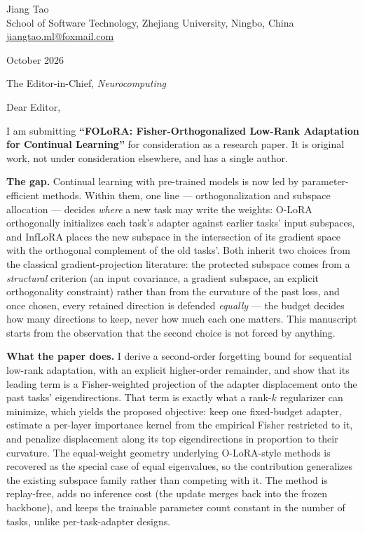 \documentclass[10pt]{article}
\begin{document}
\begin{flushright}
Jiang Tao\\
School of Software Technology, Zhejiang University, Ningbo, China\\
\href{mailto:jiangtao.ml@foxmail.com}{jiangtao.ml@foxmail.com}
\end{flushright}

\vspace{-1em}
 October 2026

\vspace{-0.5em}
\noindent The Editor-in-Chief, \emph{Neurocomputing}

\vspace{-0.5em}
\noindent Dear Editor,

I am submitting \textbf{``FOLoRA: Fisher-Orthogonalized Low-Rank Adaptation for Continual
Learning''} for consideration as a research paper. It is original work, not under
consideration elsewhere, and has a single author.

\textbf{The gap.} Continual learning with pre-trained models is now led by
parameter-efficient methods. Within them, one line --- orthogonalization and subspace
allocation --- decides \emph{where} a new task may write the weights: O-LoRA orthogonally
initializes each task's adapter against earlier tasks' input subspaces, and InfLoRA places
the new subspace in the intersection of its gradient space with the orthogonal complement
of the old tasks'. Both inherit two choices from the classical gradient-projection
literature: the protected subspace comes from a \emph{structural} criterion (an input
covariance, a gradient subspace, an explicit orthogonality constraint) rather than from
the curvature of the past loss, and once chosen, every retained direction is defended
\emph{equally} --- the budget decides how many directions to keep, never how much each one
matters. This manuscript starts from the observation that the second choice is not forced
by anything.

\textbf{What the paper does.} I derive a second-order forgetting bound for sequential
low-rank adaptation, with an explicit higher-order remainder, and show that its leading
term is a Fisher-weighted projection of the adapter displacement onto the past tasks'
eigendirections. That term is exactly what a rank-$k$ regularizer can minimize, which
yields the proposed objective: keep one fixed-budget adapter, estimate a per-layer
importance kernel from the empirical Fisher restricted to it, and penalize displacement
along its top eigendirections in proportion to their curvature. The equal-weight geometry
underlying O-LoRA-style methods is recovered as the special case of equal eigenvalues, so
the contribution generalizes the existing subspace family rather than competing with it.
The method is replay-free, adds no inference cost (the update merges back into the frozen
backbone), and keeps the trainable parameter count constant in the number of tasks,
unlike per-task-adapter designs.
\end{document}
